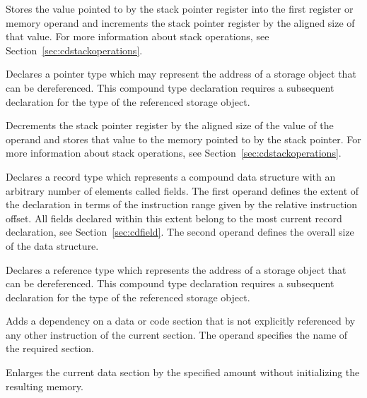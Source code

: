 
Stores the value pointed to by the stack pointer register into the first register or memory operand and increments the stack pointer register by the aligned size of that value.
For more information about stack operations, see Section~\ref{sec:cdstackoperations}.


Declares a pointer type which may represent the address of a storage object that can be dereferenced.
This compound type declaration requires a subsequent declaration for the type of the referenced storage object.


Decrements the stack pointer register by the aligned size of the value of the operand and stores that value to the memory pointed to by the stack pointer.
For more information about stack operations, see Section~\ref{sec:cdstackoperations}.


Declares a record type which represents a compound data structure with an arbitrary number of elements called fields.
The first operand defines the extent of the declaration in terms of the instruction range given by the relative instruction offset.
All fields declared within this extent belong to the most current record declaration, see Section~\ref{sec:cdfield}.
The second operand defines the overall size of the data structure.


Declares a reference type which represents the address of a storage object that can be dereferenced.
This compound type declaration requires a subsequent declaration for the type of the referenced storage object.


Adds a dependency on a data or code section that is not explicitly referenced by any other instruction of the current section.
The operand specifies the name of the required section.


Enlarges the current data section by the specified amount without initializing the resulting memory.


